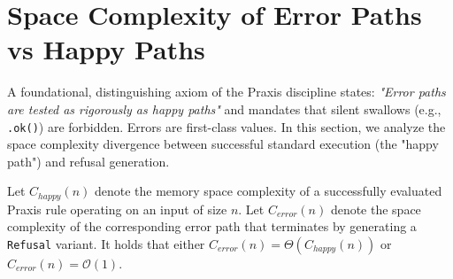 \section{Space Complexity of Error Paths vs Happy Paths}

A foundational, distinguishing axiom of the Praxis discipline states: \textit{"Error paths are tested as rigorously as happy paths"} and mandates that silent swallows (e.g., \texttt{.ok()}) are forbidden. Errors are first-class values. In this section, we analyze the space complexity divergence between successful standard execution (the "happy path") and refusal generation.

\begin{theorem}
\label{thm:space_isomorphism}
Let $C_{happy}(n)$ denote the memory space complexity of a successfully evaluated Praxis rule operating on an input of size $n$. Let $C_{error}(n)$ denote the space complexity of the corresponding error path that terminates by generating a \texttt{Refusal} variant. It holds that either $C_{error}(n) = \Theta(C_{happy}(n))$ or $C_{error}(n) = \mathcal{O}(1)$.
\end{theorem}

